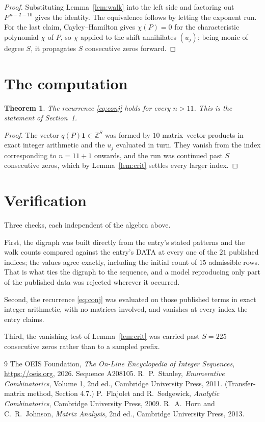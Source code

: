 \documentclass[11pt,a4paper]{article}
\theoremstyle{plain}
\newtheorem{theorem}{Theorem}
\theoremstyle{definition}
\begin{document}
\begin{proof}
Substituting Lemma~\ref{lem:walk} into the left side and factoring out
$P^{\,n-2-10}$ gives the identity. The equivalence follows by letting the exponent
run. For the last claim, Cayley--Hamilton gives $\chi(P)=0$ for the characteristic
polynomial $\chi$ of $P$, so $\chi$ applied to the shift annihilates $(u_j)$; being monic of
degree $S$, it propagates $S$ consecutive zeros forward.
\end{proof}

\section{The computation}

\begin{theorem}
The recurrence \eqref{eq:conj} holds for every $n>11$. This is the statement of
Section~1.
\end{theorem}

\begin{proof}
The vector $q(P)\mathbf{1}\in\mathbb{Z}^{S}$ was formed by $10$ matrix--vector
products in exact integer arithmetic and the $u_j$ evaluated in turn. They vanish from the
index corresponding to $n=11+1$ onwards, and the run was continued past $S$ consecutive
zeros, which by Lemma~\ref{lem:crit} settles every larger index.
\end{proof}

\section{Verification}

Three checks, each independent of the algebra above.

First, the digraph was built directly from the entry's stated patterns and the walk counts
compared against the entry's DATA at every one of the $21$ published indices; the
values agree exactly, including the initial count of $15$ admissible rows. That is
what ties the digraph to the sequence, and a model reproducing only part of the published
data was rejected wherever it occurred.

Second, the recurrence \eqref{eq:conj} was evaluated on those published terms in exact
integer arithmetic, with no matrices involved, and vanishes at every index the entry claims.

Third, the vanishing test of Lemma~\ref{lem:crit} was carried past $S=225$ consecutive
zeros rather than to a sampled prefix.

\begin{thebibliography}{9}
 The OEIS Foundation, \emph{The On-Line Encyclopedia of Integer
Sequences}, \url{https://oeis.org}, 2026. Sequence A208105.
 R.~P.~Stanley, \emph{Enumerative Combinatorics}, Volume 1, 2nd ed.,
Cambridge University Press, 2011. (Transfer-matrix method, Section 4.7.)
 P.~Flajolet and R.~Sedgewick, \emph{Analytic Combinatorics}, Cambridge
University Press, 2009.
 R.~A.~Horn and C.~R.~Johnson, \emph{Matrix Analysis}, 2nd ed., Cambridge
University Press, 2013.
\end{thebibliography}
\end{document}
